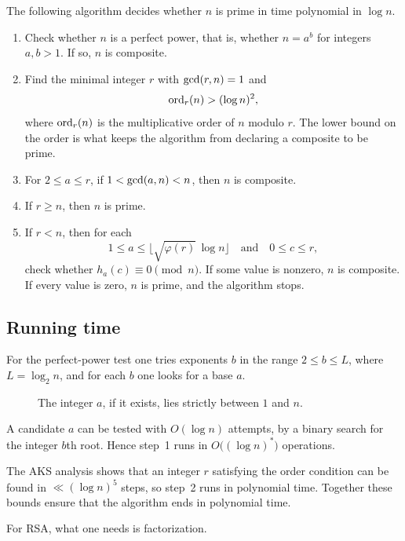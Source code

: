 \begin{keybox}
\begin{theorem}[AKS]
The following algorithm decides whether \(n\) is prime in time polynomial in \(\log n\).
\begin{enumerate}[leftmargin=1.6em]
    \item Check whether \(n\) is a perfect power, that is, whether \(n=a^{b}\) for integers \(a,b>1\). If so, \(n\) is composite.
    \item Find the minimal integer \(r\) with \(\operatorname{gcd}(r,n)=1\) and
    \[
        \operatorname{ord}_{r}(n)>(\log n)^{2},
    \]
    where \(\operatorname{ord}_{r}(n)\) is the multiplicative order of \(n\) modulo \(r\). The lower bound on the order is what keeps the algorithm from declaring a composite to be prime.
    \item For \(2\le a\le r\), if \(1<\operatorname{gcd}(a,n)<n\), then \(n\) is composite.
    \item If \(r\ge n\), then \(n\) is prime.
    \item If \(r<n\), then for each
    \[
        1\le a\le\bigl\lfloor\sqrt{\varphi(r)}\,\log n\bigr\rfloor
        \quad\text{and}\quad
        0\le c\le r,
    \]
    check whether \(h_{a}(c)\equiv 0\pmod{n}\). If some value is nonzero, \(n\) is composite. If every value is zero, \(n\) is prime, and the algorithm stops.
\end{enumerate}
\end{theorem}
\end{keybox}

\subsection{Running time}
For the perfect-power test one tries exponents \(b\) in the range \(2\le b\le L\), where \(L=\log_{2} n\), and for each \(b\) one looks for a base \(a\).

\begin{figure}[H]
\centering
{}
\caption{The integer \(a\), if it exists, lies strictly between \(1\) and \(n\).}
\end{figure}

\noindent
A candidate \(a\) can be tested with \(O(\log n)\) attempts, by a binary search for the integer \(b\)th root. Hence step~1 runs in \(O\bigl((\log n)^{*}\bigr)\) operations.

The AKS analysis shows that an integer \(r\) satisfying the order condition can be found in \(\ll(\log n)^{5}\) steps, so step~2 runs in polynomial time. Together these bounds ensure that the algorithm ends in polynomial time.

For RSA, what one needs is factorization.

